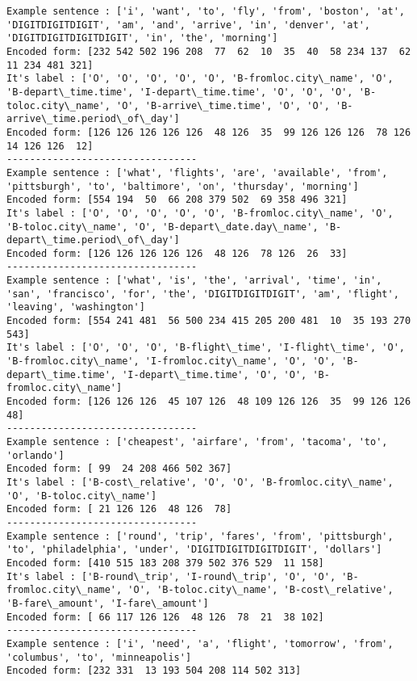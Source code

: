 \documentclass[11pt]{article}
\begin{document}
    \begin{Verbatim}[commandchars=\\\{\}]
Example sentence : ['i', 'want', 'to', 'fly', 'from', 'boston', 'at', 'DIGITDIGITDIGIT', 'am', 'and', 'arrive', 'in', 'denver', 'at', 'DIGITDIGITDIGITDIGIT', 'in', 'the', 'morning']
Encoded form: [232 542 502 196 208  77  62  10  35  40  58 234 137  62  11 234 481 321]
It's label : ['O', 'O', 'O', 'O', 'O', 'B-fromloc.city\_name', 'O', 'B-depart\_time.time', 'I-depart\_time.time', 'O', 'O', 'O', 'B-toloc.city\_name', 'O', 'B-arrive\_time.time', 'O', 'O', 'B-arrive\_time.period\_of\_day']
Encoded form: [126 126 126 126 126  48 126  35  99 126 126 126  78 126  14 126 126  12]
---------------------------------
Example sentence : ['what', 'flights', 'are', 'available', 'from', 'pittsburgh', 'to', 'baltimore', 'on', 'thursday', 'morning']
Encoded form: [554 194  50  66 208 379 502  69 358 496 321]
It's label : ['O', 'O', 'O', 'O', 'O', 'B-fromloc.city\_name', 'O', 'B-toloc.city\_name', 'O', 'B-depart\_date.day\_name', 'B-depart\_time.period\_of\_day']
Encoded form: [126 126 126 126 126  48 126  78 126  26  33]
---------------------------------
Example sentence : ['what', 'is', 'the', 'arrival', 'time', 'in', 'san', 'francisco', 'for', 'the', 'DIGITDIGITDIGIT', 'am', 'flight', 'leaving', 'washington']
Encoded form: [554 241 481  56 500 234 415 205 200 481  10  35 193 270 543]
It's label : ['O', 'O', 'O', 'B-flight\_time', 'I-flight\_time', 'O', 'B-fromloc.city\_name', 'I-fromloc.city\_name', 'O', 'O', 'B-depart\_time.time', 'I-depart\_time.time', 'O', 'O', 'B-fromloc.city\_name']
Encoded form: [126 126 126  45 107 126  48 109 126 126  35  99 126 126  48]
---------------------------------
Example sentence : ['cheapest', 'airfare', 'from', 'tacoma', 'to', 'orlando']
Encoded form: [ 99  24 208 466 502 367]
It's label : ['B-cost\_relative', 'O', 'O', 'B-fromloc.city\_name', 'O', 'B-toloc.city\_name']
Encoded form: [ 21 126 126  48 126  78]
---------------------------------
Example sentence : ['round', 'trip', 'fares', 'from', 'pittsburgh', 'to', 'philadelphia', 'under', 'DIGITDIGITDIGITDIGIT', 'dollars']
Encoded form: [410 515 183 208 379 502 376 529  11 158]
It's label : ['B-round\_trip', 'I-round\_trip', 'O', 'O', 'B-fromloc.city\_name', 'O', 'B-toloc.city\_name', 'B-cost\_relative', 'B-fare\_amount', 'I-fare\_amount']
Encoded form: [ 66 117 126 126  48 126  78  21  38 102]
---------------------------------
Example sentence : ['i', 'need', 'a', 'flight', 'tomorrow', 'from', 'columbus', 'to', 'minneapolis']
Encoded form: [232 331  13 193 504 208 114 502 313]

\end{Verbatim}
\end{document}
